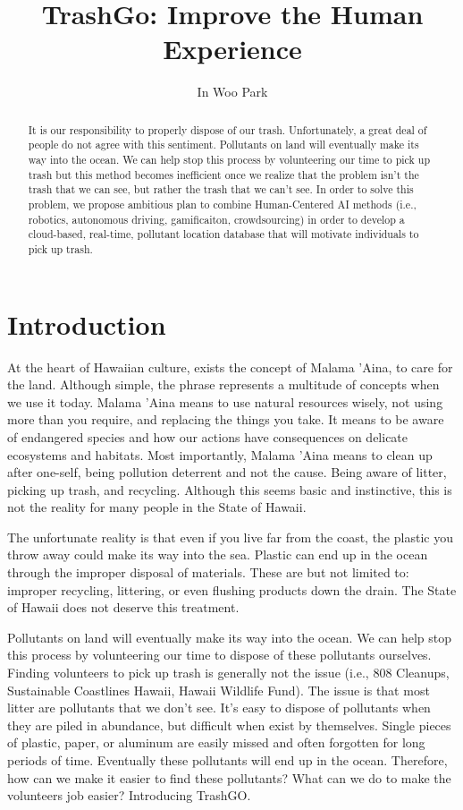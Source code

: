 \documentclass[
  journal=small,
  manuscript=article-type,  %
  year=2022,
  volume=1,
]{cup-journal}
\title{TrashGo: Improve the Human Experience}
\author{In Woo Park}
\affiliation{ICS 691D: Human-Centered AI, University of Hawaii at Manoa}
\begin{document}
\begin{abstract}
It is our responsibility to properly dispose of our trash. Unfortunately, a great deal of people do not agree with this sentiment. Pollutants on land will eventually make its way into the ocean. We can help stop this process by volunteering our time to pick up trash but this method becomes inefficient once we realize that the problem isn't the trash that we can see, but rather the trash that we can't see. In order to solve this problem, we propose ambitious plan to combine Human-Centered AI methods (i.e., robotics, autonomous driving, gamificaiton, crowdsourcing) in order to develop a cloud-based, real-time, pollutant location database that will motivate individuals to pick up trash. 
\end{abstract}
\vspace*{-2.5em}
\section{Introduction}
At the heart of Hawaiian culture, exists the concept of Malama 'Aina, to care for the land. Although simple, the phrase represents a multitude of concepts when we use it today. Malama 'Aina means to use natural resources wisely, not using more than you require, and replacing the things you take. It means to be aware of endangered species and how our actions have consequences on delicate ecosystems and habitats. Most importantly, Malama 'Aina means to clean up after one-self, being pollution deterrent and not the cause. Being aware of litter, picking up trash, and recycling. Although this seems basic and instinctive, this is not the reality for many people in the State of Hawaii. 

The unfortunate reality is that even if you live far from the coast, the plastic you throw away could make its way into the sea. Plastic can end up in the ocean through the improper disposal of materials. These are but not limited to: improper recycling, littering, or even flushing products down the drain. The State of Hawaii does not deserve this treatment. 

Pollutants on land will eventually make its way into the ocean. We can help stop this process by volunteering our time to dispose of these pollutants ourselves. Finding volunteers to pick up trash is generally not the issue (i.e., 808 Cleanups, Sustainable Coastlines Hawaii, Hawaii Wildlife Fund). The issue is that most litter are pollutants that we don't see. It's easy to dispose of pollutants when they are piled in abundance, but difficult when exist by themselves. Single pieces of plastic, paper, or aluminum are easily missed and often forgotten for long periods of time. Eventually these pollutants will end up in the ocean. Therefore, how can we make it easier to find these pollutants? What can we do to make the volunteers job easier? Introducing TrashGO.
\end{document}
